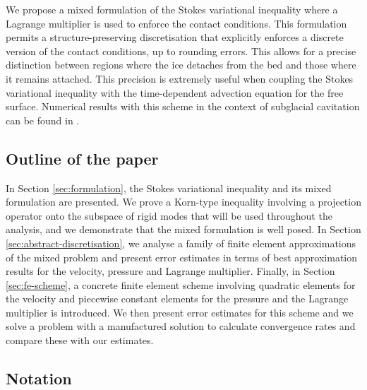 \documentclass[onefignum,onetabnum]{siamart190516}
\begin{document}
We propose a mixed formulation of the Stokes variational inequality where a Lagrange multiplier is used to enforce the contact conditions. This formulation permits a structure-preserving discretisation that explicitly enforces a discrete version of the contact conditions, up to rounding errors. This allows for a precise distinction between regions where the ice detaches from the bed and those where it remains attached. This precision is extremely useful when coupling the Stokes variational inequality with the time-dependent advection equation for the free surface. Numerical results with this scheme in the context of subglacial cavitation can be found in \cite{dediego2022}.

\subsection{Outline of the paper}

In Section \ref{sec:formulation}, the Stokes variational inequality and its mixed formulation are presented. We prove a Korn-type inequality involving a projection operator onto the subspace of rigid modes that will be used throughout the analysis, and we demonstrate that the mixed formulation is well posed. In Section \ref{sec:abstract-discretisation}, we analyse a family of finite element approximations of the mixed problem and present error estimates in terms of best approximation results for the velocity, pressure and Lagrange multiplier. Finally, in Section \ref{sec:fe-scheme}, a concrete finite element scheme involving quadratic elements for the velocity and piecewise constant elements for the pressure and the Lagrange multiplier is introduced. We then present error estimates for this scheme and we solve a problem with a manufactured solution to calculate convergence rates and compare these with our estimates.

\subsection{Notation}
\end{document}
